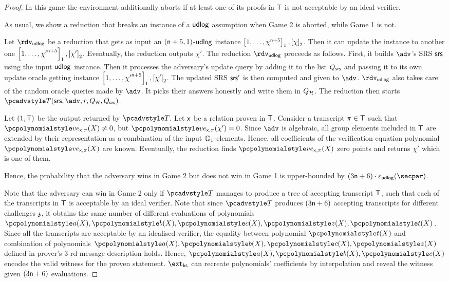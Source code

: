 \begin{proof}
  In this game the environment additionally aborts if at least one of its proofs in $\mathsf{T}$ is not acceptable by an ideal verifier.

  As usual, we show a reduction that breaks an instance of a $\mathsf{udlog}$ assumption when Game 2 is aborted, while Game 1 is not.

  Let $\rdvudlog$ be a reduction that gets as input an $(\mathsf{n} + 5, 1)$-$\mathsf{udlog}$ instance $\left[1, \ldots, \chi^{\mathsf{n} + 5}\right]_{1}, \left[\chi\right]_{2}$. Then it can update the instance to another one $\left[1, \ldots, {\chi'}^{\mathsf{n} + 5}\right]_{1}, \left[\chi'\right]_{2}$. Eventually, the reduction outputs $\chi'$.
	The reduction $\rdvudlog$ proceeds as follows.
	First, it builds $\adv$'s SRS $\mathsf{srs}$ using the input $\mathsf{udlog}$ instance. Then it processes the adversary's update query by adding it to the list $Q_{\mathsf{srs}}$ and passing it to its own update oracle getting instance $\left[1, \ldots, {\chi'}^{\mathsf{n} + 5}\right]_{1}, \left[\chi'\right]_{2}$. The updated SRS $\mathsf{srs}'$ is then computed and given to $\adv$. $\rdvdulog$ also takes care of the random oracle queries made by $\adv$. It picks their answers honestly and write them in $Q_{\mathcal{H}}$. The reduction then starts $\tdv(\srs, \adv, r, \Qro, \Qsrs)$.
	
  Let $(1, \mathsf{T})$ be the output returned by $\tdv$. Let $\mathsf{x}$ be a relation proven in $\mathsf{T}$.  Consider a transcript $\pi \in \mathsf{T}$ such that $\vereq_{\inp, \zkproof}(X) \neq 0$, but $\vereq_{\inp, \zkproof}(\chi') = 0$. Since $\adv$ is algebraic, all group elements included in $\mathsf{T}$ are extended by their representation as a combination of the input $\mathbb{G}_1$-elements. Hence, all coefficients of the verification equation polynomial $\vereq_{\inp, \zkproof}(X)$ are known. 
  Eventually, the reduction finds $\vereq_{\inp, \zkproof}(X)$ zero points and returns $\chi'$ which is one of them.
    
  Hence, the probability that the adversary wins in Game 2 but does not win in Game 1 is upper-bounded by $(3 \noofc + 6) \cdot \epsudlog (\secpar)$.

  Note that the adversary can win in Game 2 only if $\tdv$ manages to produce a tree of accepting transcript $\mathsf{T}$, such that each of the transcripts in $\mathsf{T}$ is acceptable by an ideal verifier. Note that since $\tdv$ produces $(3 \mathsf{n} + 6)$ accepting transcripts for different challenges $\mathfrak{z}$, it obtains the same number of different evaluations of polynomials $\p{a} (X), \p{b} (X), \p{c} (X), \p{z} (X), \p{t} (X)$. Since all the transcripts are acceptable by an idealised verifier, the equality between polynomial $\p{t} (X)$ and combination of polynomials $\p{a} (X), \p{b} (X), \p{c} (X), \p{z} (X)$ defined in prover's $3$-rd message description holds. Hence, $\p{a} (X), \p{b} (X), \p{c} (X)$ encodes the valid witness for the proven statement. $\extcss$ can recreate polynomials' coefficients by interpolation and reveal the witness given $(3 \mathsf{n} + 6)$ evaluations. 


\end{proof}
